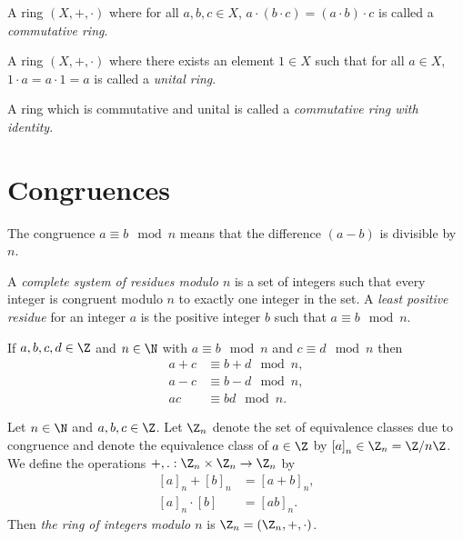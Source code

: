 \documentclass{article}
\begin{document}
\begin{definition}
    A ring $(X,+,\cdot)$ where for all $a,b,c\in X$, $a\cdot(b\cdot c) = (a\cdot b)\cdot c$
    is called a \emph{commutative ring}.
\end{definition}

\begin{definition}
    A ring $(X,+,\cdot)$ where there exists an element $1\in X$ such that 
    for all $a\in X$, $1\cdot a = a \cdot 1 = a$ is called a \emph{unital ring}.
\end{definition}

\begin{definition}
    A ring which is commutative and unital is called a \emph{commutative ring
    with identity}.
\end{definition}

\section{Congruences}

\begin{definition}[Congruence]
    The congruence $a\equiv b\mod n$ means that the difference $(a-b)$ is 
    divisible by $n$.
\end{definition}

\begin{definition}
    A \emph{complete system of residues modulo $n$} is a set of integers 
    such that every integer is congruent modulo $n$ to exactly one integer 
    in the set. A \emph{least positive residue} for an integer $a$ is the 
    positive integer $b$ such that $a\equiv b \mod n$.
\end{definition}

\begin{theorem}
    If $a,b,c,d\in\Z$ and $n\in\N$ with $a\equiv b\mod n$ and $c\equiv d\mod n$
    then 
    \begin{align*}
        a+c & \equiv b+d \mod n,\\
        a-c & \equiv b-d \mod n,\\
        ac  & \equiv bd  \mod n.
    \end{align*} 
\end{theorem}

\begin{definition}
    Let $n\in\N$ and $a,b,c\in\Z$. Let $\Z_n$ denote the set of equivalence
    classes due to congruence and denote the equivalence class of $a\in\Z$ by 
    $\left[a\right]_n\in\Z_n=\Z/n\Z$. We define the operations $+,.:\Z_n\times\Z_n\to\Z_n$
    by 
    \begin{align*}
        \left[a\right]_n +     \left[b\right]_n   & = \left[a+b\right]_n,\\
        \left[a\right]_n \cdot \left[b\right]     & = \left[ab\right]_n.
    \end{align*}
    Then \emph{the ring of integers modulo $n$} is $\Z_n=(\Z_n,+,\cdot)$.
\end{definition}
\end{document}
